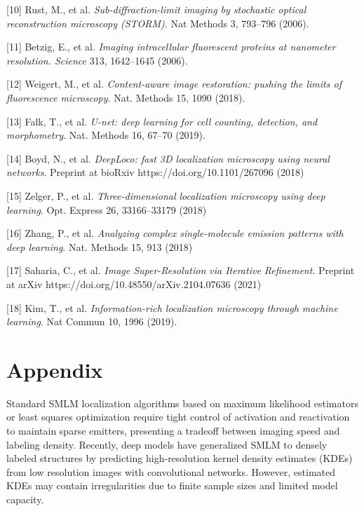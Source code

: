 \documentclass{article}
\begin{document}
{[10] Rust, M., et al. {\it Sub-diffraction-limit imaging by stochastic optical reconstruction microscopy (STORM)}. Nat Methods 3, 793–796 (2006).

[11] Betzig, E., et al. {\it Imaging intracellular fluorescent proteins at nanometer resolution. Science} 313, 1642–1645 (2006).

[12] Weigert, M., et al. {\it Content-aware image restoration: pushing the limits of fluorescence microscopy}. Nat. Methods 15, 1090 (2018).

[13] Falk, T., et al. {\it U-net: deep learning for cell counting, detection, and morphometry}. Nat. Methods 16, 67–70 (2019).

[14] Boyd, N., et al. {\it DeepLoco: fast 3D localization microscopy using neural networks}. Preprint at bioRxiv https://doi.org/10.1101/267096 (2018)

[15] Zelger, P., et al. {\it Three-dimensional localization microscopy using deep learning}. Opt. Express 26, 33166–33179 (2018)

[16] Zhang, P., et al. {\it Analyzing complex single-molecule emission patterns with deep learning}. Nat. Methods 15, 913 (2018)

[17] Saharia, C., et al. {\it Image Super-Resolution via Iterative Refinement}. Preprint at arXiv https://doi.org/10.48550/arXiv.2104.07636 (2021)

[18] Kim, T., et al. {\it Information-rich localization microscopy through machine learning}. Nat Commun 10, 1996 (2019). 

}

\appendix

\section{Appendix}

Standard SMLM localization algorithms based on maximum likelihood estimators or least squares optimization require tight control of activation and reactivation to maintain sparse emitters, presenting a tradeoff between imaging speed and labeling density. Recently, deep models have generalized SMLM to densely labeled structures by predicting high-resolution kernel density estimates (KDEs) from low resolution images with convolutional networks. However, estimated KDEs may contain irregularities due to finite sample sizes and limited model capacity. 
\end{document}
